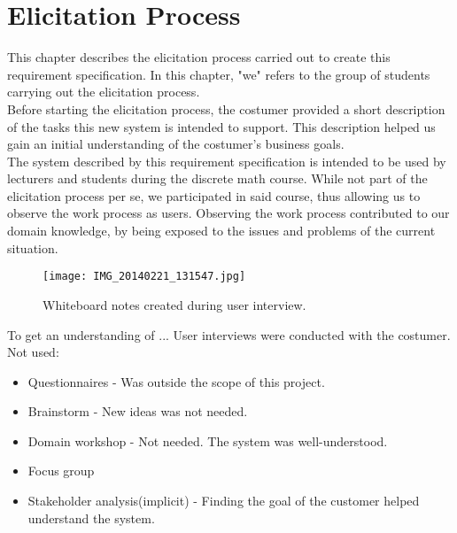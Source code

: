\documentclass[Main]{subfiles}
\begin{document}
\chapter{Elicitation Process}\label{cha:Elicitation}

This chapter describes the elicitation process carried out to create this requirement specification. In this chapter, "we" refers to the group of students carrying out the elicitation process.\\

Before starting the elicitation process, the costumer provided a short description of the tasks this new system is intended to support. This description helped us gain an initial understanding of the costumer's business goals.\\
 
The system described by this requirement specification is intended to be used by lecturers and students during the discrete math course. While not part of the elicitation process per se, we participated in said course, thus allowing us to observe the work process as users. Observing the work process contributed to our domain knowledge, by being exposed to the issues and problems of the current situation.\\

\begin{wrapfigure}{r}{0.6\textwidth}
\begin{center}
\texttt{[image: IMG\_20140221\_131547.jpg]}
\end{center}
\caption{Whiteboard notes created during user interview.}
\label{fig:UserInterviewNotes}
\end{wrapfigure}

To get an understanding of ... User interviews were conducted with the costumer. 
\\

Not used:
\begin{itemize}
\item Questionnaires - Was outside the scope of this project.
\item Brainstorm - New ideas was not needed.
\item Domain workshop - Not needed. The system was well-understood.
\item Focus group
\item Stakeholder analysis(implicit) - Finding the goal of the customer helped understand the system.
\end{itemize}
\end{document}
